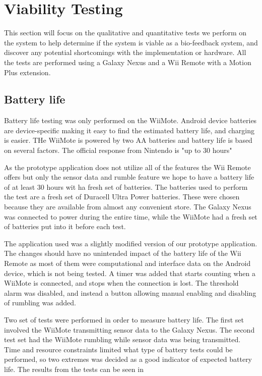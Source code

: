 \chapter{Viability Testing}
This section will focus on the qualitative and quantitative tests we perform on the system to help determine if the system is viable as a bio-feedback system, and discover any potential shortcomings with the implementation or hardware. All the tests are performed using a Galaxy Nexus \cite{galaxyNexus} and a Wii Remote with a Motion Plus extension.

\section{Battery life}
Battery life testing was only performed on the WiiMote. Android device batteries are device-specific making it easy to find the estimated battery life, and charging is easier. THe WiiMote is powered by two AA batteries and battery life is based on several factors. The official response from Nintendo is "up to 30 hours" \cite{wiiBattery}

As the prototype application does not utilize all of the features the Wii Remote offers but only the sensor data and rumble feature we hope to have a battery life of at least 30 hours wit ha fresh set of batteries. The batteries used to perform the test are a fresh set of Duracell Ultra Power batteries. These were chosen because they are available from almost any convenient store. The Galaxy Nexus was connected to power during the entire time, while the WiiMote had a fresh set of batteries put into it before each test.

The application used was a slightly modified version of our prototype application. The changes should have no unintended impact of the battery life of the Wii Remote as most of them were computational and interface data on the Android device, which is not being tested. A timer was added that starts counting when a WiiMote is connected, and stops when the connection is lost. The threshold alarm was disabled, and instead a button allowing manual enabling and disabling of rumbling was added.

Two set of tests were performed in order to measure battery life. The first set involved the WiiMote transmitting sensor data to the Galaxy Nexus. The second test set had the WiiMote rumbling while sensor data was being transmitted. Time and resource constraints limited what type of battery tests could be performed, so two extremes was decided as a good indicator of expected battery life. The results from the tests can be seen in %

